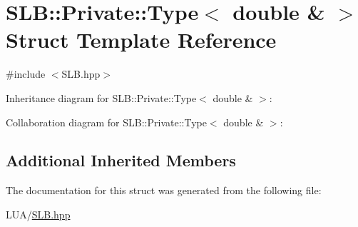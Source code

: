 \hypertarget{structSLB_1_1Private_1_1Type_3_01double_01_6_01_4}{}\section{S\+LB\+:\+:Private\+:\+:Type$<$ double \& $>$ Struct Template Reference}
\label{structSLB_1_1Private_1_1Type_3_01double_01_6_01_4}


{\ttfamily \#include $<$S\+L\+B.\+hpp$>$}



Inheritance diagram for S\+LB\+:\+:Private\+:\+:Type$<$ double \& $>$\+:


Collaboration diagram for S\+LB\+:\+:Private\+:\+:Type$<$ double \& $>$\+:
\subsection*{Additional Inherited Members}


The documentation for this struct was generated from the following file\+:\begin{DoxyCompactItemize}
\item 
L\+U\+A/\hyperlink{SLB_8hpp}{S\+L\+B.\+hpp}\end{DoxyCompactItemize}

